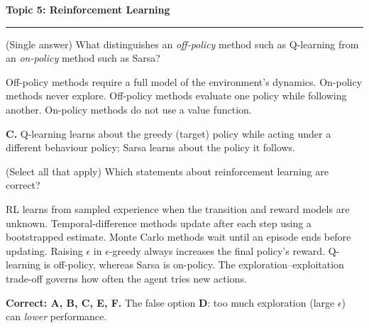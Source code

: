 \documentclass[answers,addpoints]{exam}
\newcommand{\topic}[2]{%
  \vspace{1.0\baselineskip}%
  \noindent\textbf{\large Topic #1: #2}\par
  \noindent\rule{\linewidth}{0.4pt}\par
  \vspace{0.4\baselineskip}}
\begin{document}
\begin{questions}

\topic{5}{Reinforcement Learning}

\question[2] (Single answer) What distinguishes an \emph{off-policy} method such as
Q-learning from an \emph{on-policy} method such as Sarsa?
\begin{choices}
  \choice Off-policy methods require a full model of the environment's dynamics.
  \choice On-policy methods never explore.
  \CorrectChoice Off-policy methods evaluate one policy while following another.
  \choice On-policy methods do not use a value function.
\end{choices}
\begin{solution}\textbf{C.} Q-learning learns about the greedy (target) policy while
acting under a different behaviour policy; Sarsa learns about the policy it follows.\end{solution}

\question[3] (Select all that apply) Which statements about reinforcement learning
are correct?
\begin{checkboxes}
  \CorrectChoice RL learns from sampled experience when the transition and reward
        models are unknown.
  \CorrectChoice Temporal-difference methods update after each step using a
        bootstrapped estimate.
  \CorrectChoice Monte Carlo methods wait until an episode ends before updating.
  \choice Raising $\epsilon$ in $\epsilon$-greedy always increases the final
        policy's reward.
  \CorrectChoice Q-learning is off-policy, whereas Sarsa is on-policy.
  \CorrectChoice The exploration--exploitation trade-off governs how often the
        agent tries new actions.
\end{checkboxes}
\begin{solution}
\textbf{Correct: A, B, C, E, F.} The false option \textbf{D}: too much exploration
(large $\epsilon$) can \emph{lower} performance.
\end{solution}


\end{questions}
\end{document}
